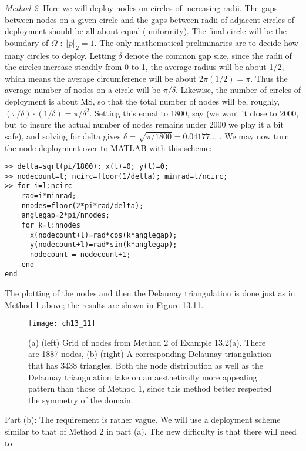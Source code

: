 \documentclass[../main.tex]{subfiles}
\begin{document}
\textit{Method 2}: Here we will deploy nodes on circles of increasing radii. The gaps between nodes on a given circle and the gaps between radii of adjacent circles of deployment should be all about equal (uniformity). The final circle will be the boundary of $\Omega$ : $\Vert p \Vert_2 =1$. The only mathematical preliminaries are to decide how many circles to deploy. Letting $\delta$ denote the common gap size, since the radii of the circles increase steadily from 0 to 1, the average radius will be about 1/2, which means the average circumference will be about $2\pi(1/2)=\pi$. Thus the average number of nodes on a circle will be $\pi / \delta$. Likewise, the number of circles of deployment is about MS, so that the total number of nodes will be, roughly, $(\pi/\delta) \cdot (1/\delta)=\pi/\delta^2$. Setting this equal to 1800, say (we want it close to 2000, but to insure the actual number of nodes remains under 2000 we play it a bit safe), and solving for delta gives $\delta = \sqrt{\pi/1800}=0.04177...$ . We may now turn the node deployment over to MATLAB with this scheme: 

\begin{lstlisting}[numbers=none,frame=none]
>> delta=sqrt(pi/1800); x(l)=0; y(l)=0; 
>> nodecount=l; ncirc=floor(1/delta); minrad=l/ncirc; 
>> for i=l:ncirc 
	rad=i*minrad; 
	nnodes=floor(2*pi*rad/delta); 
	anglegap=2*pi/nnodes; 
	for k=l:nnodes 
	  x(nodecount+l)=rad*cos(k*anglegap); 
	  y(nodecount+l)=rad*sin(k*anglegap); 
	  nodecount = nodecount+1; 
	end 
end
\end{lstlisting}

The plotting of the nodes and then the Delaunay triangulation is done just as in 
Method 1 above; the results are shown in Figure 13.11. 

\begin{figure}[H]
	\centering
	\texttt{[image: ch13\_11]}
	\caption{\textsf{(a) (left) Grid of nodes from Method 2 of Example 13.2(a). There are 1887 nodes, (b) (right) A corresponding Delaunay triangulation that has 3438 triangles. Both the node distribution as well as the Delaunay triangulation take on an aesthetically more appealing pattern than those of Method 1, since this method better respected the symmetry of the domain. }}
	\label{pfig:ch13_11}
\end{figure}

Part (b): The requirement is rather vague. We will use a deployment scheme similar to that of Method 2 in part (a). The new difficulty is that there will need to
\end{document}
